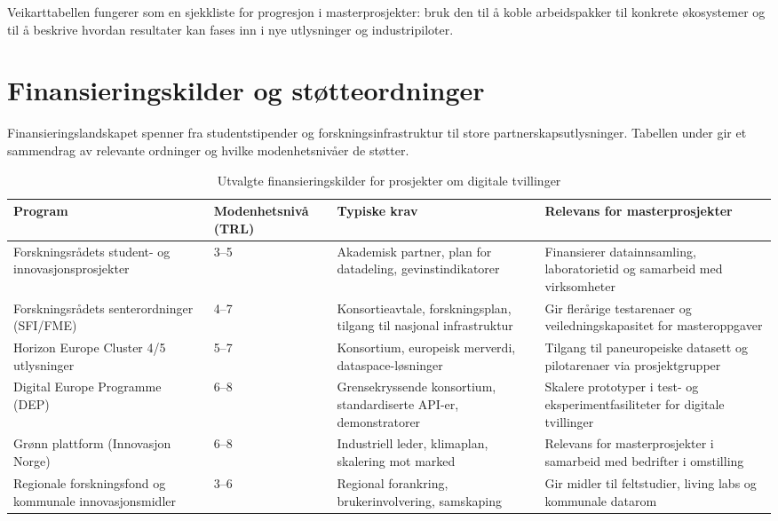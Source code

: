 Veikarttabellen fungerer som en sjekkliste for progresjon i masterprosjekter: bruk den til å koble arbeidspakker til konkrete økosystemer og til å beskrive hvordan resultater kan fases inn i nye utlysninger og industripiloter.

\section{Finansieringskilder og støtteordninger}
Finansieringslandskapet spenner fra studentstipender og forskningsinfrastruktur til store partnerskapsutlysninger. Tabellen under gir et sammendrag av relevante ordninger og hvilke modenhetsnivåer de støtter.

\begin{table}[h]
    \centering
    \caption{Utvalgte finansieringskilder for prosjekter om digitale tvillinger}
    \label{tab:finansiering}
    \begin{tabular}{p{3.0cm}p{2.4cm}p{4.3cm}p{3.5cm}}
        \toprule
        Program & Modenhetsnivå (TRL) & Typiske krav & Relevans for masterprosjekter \\
        \midrule
        Forskningsrådets student- og innovasjonsprosjekter & 3--5 & Akademisk partner, plan for datadeling, gevinstindikatorer & Finansierer datainnsamling, laboratorietid og samarbeid med virksomheter \\
        Forskningsrådets senterordninger (SFI/FME) & 4--7 & Konsortieavtale, forskningsplan, tilgang til nasjonal infrastruktur & Gir flerårige testarenaer og veiledningskapasitet for masteroppgaver \\
        Horizon Europe Cluster 4/5 utlysninger & 5--7 & Konsortium, europeisk merverdi, dataspace-løsninger & Tilgang til paneuropeiske datasett og pilotarenaer via prosjektgrupper \\
        Digital Europe Programme (DEP) & 6--8 & Grensekryssende konsortium, standardiserte API-er, demonstratorer & Skalere prototyper i test- og eksperimentfasiliteter for digitale tvillinger \\
        Grønn plattform (Innovasjon Norge) & 6--8 & Industriell leder, klimaplan, skalering mot marked & Relevans for masterprosjekter i samarbeid med bedrifter i omstilling \\
        Regionale forskningsfond og kommunale innovasjonsmidler & 3--6 & Regional forankring, brukerinvolvering, samskaping & Gir midler til feltstudier, living labs og kommunale datarom \\
        \bottomrule
    \end{tabular}
\end{table}

